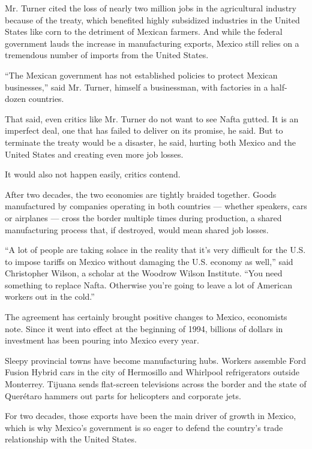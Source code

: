 Mr. Turner cited the loss of nearly two million jobs in the agricultural
industry because of the treaty, which benefited highly subsidized
industries in the United States like corn to the detriment of Mexican
farmers. And while the federal government lauds the increase in
manufacturing exports, Mexico still relies on a tremendous number of
imports from the United States.

``The Mexican government has not established policies to protect Mexican
businesses,'' said Mr. Turner, himself a businessman, with factories in
a half-dozen countries.

That said, even critics like Mr. Turner do not want to see Nafta gutted.
It is an imperfect deal, one that has failed to deliver on its promise,
he said. But to terminate the treaty would be a disaster, he said,
hurting both Mexico and the United States and creating even more job
losses.

It would also not happen easily, critics contend.

After two decades, the two economies are tightly braided together. Goods
manufactured by companies operating in both countries --- whether
speakers, cars or airplanes --- cross the border multiple times during
production, a shared manufacturing process that, if destroyed, would
mean shared job losses.

``A lot of people are taking solace in the reality that it's very
difficult for the U.S. to impose tariffs on Mexico without damaging the
U.S. economy as well,'' said Christopher Wilson, a scholar at the
Woodrow Wilson Institute. ``You need something to replace Nafta.
Otherwise you're going to leave a lot of American workers out in the
cold.''

The agreement has certainly brought positive changes to Mexico,
economists note. Since it went into effect at the beginning of 1994,
billions of dollars in investment has been pouring into Mexico every
year.

Sleepy provincial towns have become manufacturing hubs. Workers assemble
Ford Fusion Hybrid cars in the city of Hermosillo and Whirlpool
refrigerators outside Monterrey. Tijuana sends flat-screen televisions
across the border and the state of Querétaro hammers out parts for
helicopters and corporate jets.

For two decades, those exports have been the main driver of growth in
Mexico, which is why Mexico's government is so eager to defend the
country's trade relationship with the United States.

